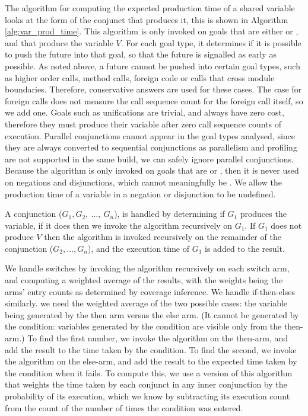 The algorithm for computing the expected production time
of a shared variable looks at the form of the conjunct that produces it,
this is shown in Algorithm \ref{alg:var_prod_time}.
This algorithm is only invoked on goals that are either \ddet or \dccmulti,
and that produce the variable $V$.
For each goal type,
it determines if it is possible to push the future into that goal,
so that the future is signalled as early as possible.
As noted above,
a future cannot be pushed into certain goal types,
such as higher order calls, method calls,
foreign code or calls that cross module boundaries.
Therefore,
conservative answers are used for these cases.
The case for foreign calls does not measure the call sequence count for the
foreign call itself, so we add one.
Goals such as unifications are trivial, and always have zero cost,
therefore they must produce their variable after zero call sequence counts
of execution.
Parallel conjunctions cannot appear in the goal types analysed,
since they are always converted to sequential conjunctions as parallelism and
profiling are not supported in the same build,
we can safely ignore parallel conjunctions.
Because the algorithm is only invoked on goals that are \ddet or \dccmulti,
then it is never used on negations and disjunctions,
which cannot meaningfully be \ddet.
We allow the production time of a variable in a negation or disjunction to
be undefined.

A conjunction 
($G_1,G_2,~\ldots,~G_n$),
is handled by determining if $G_1$ produces the variable,
if it does then we invoke the algorithm recursively on $G_1$.
If $G_1$ does not produce $V$ then the algorithm is invoked recursively on
the remainder of the conjunction ($G_2,\ldots,G_n$),
and the execution time of $G_1$ is added to the result.

We handle switches by invoking the algorithm recursively on each switch
arm,
and computing a weighted average of the results,
with the weights being the arms' entry counts as determined by coverage
inference.
We handle if-then-elses similarly.
we need the weighted average of the two possible cases:
the variable being generated by the then arm versus the else arm.
(It cannot be generated by the condition:
variables generated by the condition are visible only from the then-arm.)
To find the first number,
we invoke the algorithm on the then-arm,
and add the result to the time taken by the condition.
To find the second,
we invoke the algorithm on the else-arm,
and add the result to the expected time taken by the condition when it fails.
To compute this, we use a version of this algorithm
that weights the time taken by each conjunct in any inner conjunction
by the probability of its execution,
which we know by subtracting its execution count
from the count of the number of times the condition was entered.

